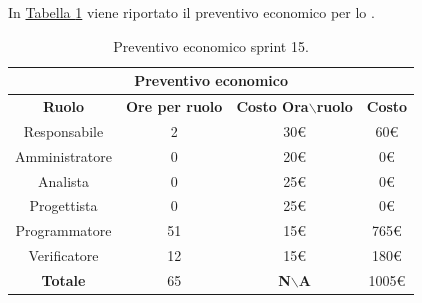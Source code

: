 In \hyperref[tab:sprint15_preventivo_economico]{Tabella \ref{tab:sprint15_preventivo_economico}} viene riportato il preventivo economico per lo .
\begin{table}[H]
    \centering
    \begin{tabular}{|c|c|c|c|}
        \hline
            \multicolumn{4}{|c|}{\textbf{Preventivo economico}} \\ 
        \hline
            \textbf{Ruolo} & \textbf{Ore per ruolo} & \textbf{Costo Ora$\backslash$ruolo} & \textbf{Costo} \\
        \hline
        Responsabile & 2 & 30€ & 60€ \\
        \hline
        Amministratore & 0 & 20€ & 0€ \\
        \hline
        Analista & 0 & 25€ & 0€ \\
        \hline
        Progettista & 0 & 25€ & 0€ \\
        \hline
        Programmatore & 51 & 15€ & 765€ \\
        \hline
        Verificatore & 12 & 15€ & 180€ \\
        \hline 
        \textbf{Totale} & 65 & \textbf{N$\backslash$A} & 1005€  \\
        \hline
    \end{tabular}
    \caption{Preventivo economico sprint 15.}
    \label{tab:sprint15_preventivo_economico}
\end{table}